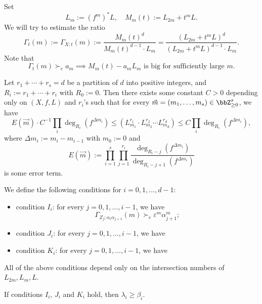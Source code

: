   Set 
  \[ L_m := (f^m)^* L, \quad M_m(t) := L_{2m} + t^m L. \]
  We will try to estimate the ratio
  \[ \Gamma_t(m) := \Gamma_{X;t}(m) := \frac{M_m(t)^{d}}{M_m(t)^{d-1} \cdot L_m} = \frac{(L_{2m} + t^m L)^{d}}{(L_{2m} + t^m L)^{d-1} \cdot L_m}. \]
  Note that 
  \[ \Gamma_t(m) \succ_e  a_m \implies M_m(t) - a_m L_m \text{ is big for sufficiently large } m. \]
  

  \begin{proposition}
    \Yang{}
    Let $r_1 + \cdots + r_s = d$ be a partition of $d$ into positive integers, and $R_i := r_1 + \cdots + r_i$ with $R_0 := 0$.
    Then there exists some constant $C > 0$ depending only on $(X,f,L)$ and $r_i$'s such that for every $\vec{m} = (m_1, \ldots, m_s) \in \bbZ_{\geq 0}^s$, we have
    \[ E(\vec{m}) \cdot C^{-1}\prod_i \deg_{R_i}(f^{\Delta m_i}) \leq (L_{m_1}^{r_1} \cdot L_{m_2}^{r_2} \cdots L_{m_d}^{r_d}) \leq C \prod_i \deg_{R_i}(f^{\Delta m_i}), \]
    where $\Delta m_i := m_i - m_{i-1}$ with $m_0 := 0$ and
    \Yang{}
    \[ E(\vec{m}) := \prod_{i=1}^s \prod_{j=1}^{r_i} \frac{\deg_{R_i - j}(f^{\Delta m_i})}{\deg_{R_i - j + 1}(f^{\Delta m_i})} \]
    is some error term.
  \end{proposition}

  \begin{definition}
    We define the following conditions for $i = 0, 1, \ldots, d-1$:
    \begin{itemize}
      \item condition $I_i$: for every $j = 0, 1, \ldots, i-1$, we have
        \[ \Gamma_{Z_j;\alpha_i \alpha_{j+1}}(m) \succ_e \varepsilon^m \alpha_{j+1}^m; \]
      \item condition $J_i$: for every $j = 0, 1, \ldots, i-1$, we have
      \item condition $K_i$: for every $j = 0, 1, \ldots, i-1$, we have
    \end{itemize}
  \end{definition}

  All of the above conditions depend only on the intersection numbers of $L_{2m}, L_m, L$.

  \begin{proposition}
    If conditions $I_i$, $J_i$ and $K_i$ hold, then $\lambda_i \geq \beta_i$.
    \Yang{}
  \end{proposition}


